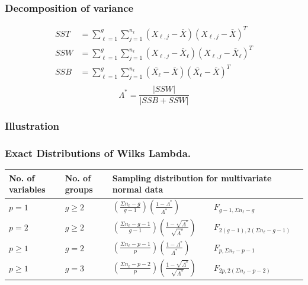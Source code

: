 \documentclass[aspectratio=169,10pt,t]{beamer}
\begin{document}
\begin{frame}[t]
	\frametitle{Decomposition of variance}
	\[
		\begin{aligned}
			SST &=
			\sum^{g}_{\ell=1} 
			\sum^{n_{\ell}}_{j=1} 
			\left( X_{\ell,j}- \bar{X} \right) 
			\left( X_{\ell,j}- \bar{X} \right) ^{T}\\
			SSW &=
			\sum^{g}_{\ell=1} 
			\sum^{n_{\ell}}_{j=1} 
			\left( X_{\ell,j}- \bar{X}_{\ell} \right) 
			\left( X_{\ell,j}- \bar{X}_{\ell} \right) ^{T}\\
			SSB &=
			\sum^{g}_{\ell=1} 
			\sum^{n_\ell}_{j=1} 
			\left( \bar{X_{\ell}}- \bar{X} \right) 
			\left( \bar{X_{\ell}}- \bar{X} \right) ^{T}\\
		\end{aligned}
	\] 
	\vspace{1cm}
	\pause
	\[
		\Lambda ^{*} = \frac{|SSW|}{|SSB + SSW |} 
	\] 

\end{frame}

\begin{frame}[t]
	\frametitle{Illustration}
	\begin{figure}[H]
		\vspace{-1cm}
		\scalebox{0.8}{
		
	}
	\end{figure} 
\end{frame}
\begin{frame}[t]
	\frametitle{Exact Distributions of Wilks Lambda.}


	\begin{tabular}{lll@{$\sim$}l}
		\toprule
		No. of variables & No. of groups &
		\multicolumn{2}{l}{Sampling distribution for multivariate normal data}\\
		\midrule
		$p=1$ & $g\geq 2$ & 
		$  \left( \frac{\Sigma n_{\ell}-g}{g-1} \right)
		\left( \frac{1-\Lambda^{*}}{\Lambda^{*}}   \right) 
		$
			& $ F_{g-1,\Sigma n_{\ell}-g} $
		 \\
		$p=2$ & $g\geq 2$ & 
		$  \left( \frac{\Sigma n_{\ell}-g-1}{g-1} \right)
		\left( \frac{1- \sqrt{ \Lambda^{*}}}{\sqrt{ \Lambda^{*}} }  \right) 
		$&$
		 F_{2 \left( g-1 \right) ,2 \left( \Sigma n_{\ell}-g-1 \right) }
		$\\
		$p\geq 1$ & $g = 2$ & 
		$  \left( \frac{\Sigma n_{\ell}-p-1}{p} \right)
		\left( \frac{1-\Lambda^{*}}{\Lambda^{*}}  \right) 
		$&$
		 F_{p,\Sigma n_{\ell}-p-1}
		$\\
		$p\geq 1$ & $g = 3$ & 
		$  \left( \frac{\Sigma n_{\ell}-p-2}{p} \right)
		\left( \frac{1- \sqrt{ \Lambda^{*}}}{\sqrt{ \Lambda^{*}} }  \right) 
		$&$
		 F_{2p,2  \left( \Sigma n_{\ell}-p-2 \right) }
		$
	\end{tabular}
	
\end{frame}
\end{document}
